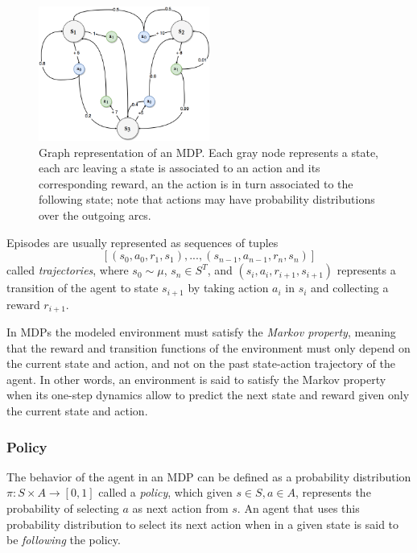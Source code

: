 \begin{figure}
    \includegraphics[width=0.5\textwidth]{pictures/mdp}
    \centering
    \caption[Graph representation of an MDP]{Graph representation of an MDP. 
	    Each gray node represents a state, each arc leaving a state is 
	    associated to an action and its corresponding reward, an the action 
	    is in turn associated to the following state; note that actions may 
	    have probability distributions over the outgoing arcs.}
    \label{f:mdp_graph}
\end{figure}
%

Episodes are usually represented as sequences of tuples 
\[
    [(s_0, a_0, r_1, s_1), ..., (s_{n-1}, a_{n-1}, r_n, s_n)]
\]
called \textit{trajectories}, where $s_0 \sim \mu$, $s_n \in S^T$, and 
$(s_i, a_i, r_{i+1}, s_{i+1})$ represents a transition of the agent to state 
$s_{i+1}$ by taking action $a_i$ in $s_i$ and collecting a reward $r_{i+1}$.

In MDPs the modeled environment must satisfy the \textit{Markov property}, 
meaning that the reward and transition functions of the environment must only 
depend on the current state and action, and not on the past state-action 
trajectory of the agent.
In other words, an environment is said to satisfy the Markov property when its 
one-step dynamics allow to predict the next state and reward given only the 
current state and action.

\subsubsection{Policy} \label{s:policies}
The behavior of the agent in an MDP can be defined as a probability 
distribution $\pi: S \times A \rightarrow [0,1]$ called a \textit{policy}, 
which given $s \in S, a \in A$, represents the probability of selecting $a$ as 
next action from $s$.
An agent that uses this probability distribution to select its next action 
when in a given state is said to be \textit{following} the policy.

